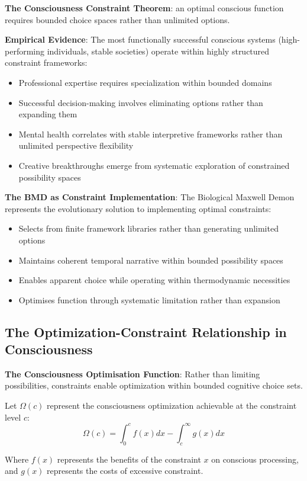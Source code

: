 \documentclass[12pt]{article}
\begin{document}
\textbf{The Consciousness Constraint Theorem}: an optimal conscious function requires bounded choice spaces rather than unlimited options.

\textbf{Empirical Evidence}: The most functionally successful conscious systems (high-performing individuals, stable societies) operate within highly structured constraint frameworks:
\begin{itemize}
\item Professional expertise requires specialization within bounded domains
\item Successful decision-making involves eliminating options rather than expanding them
\item Mental health correlates with stable interpretive frameworks rather than unlimited perspective flexibility
\item Creative breakthroughs emerge from systematic exploration of constrained possibility spaces
\end{itemize}

\textbf{The BMD as Constraint Implementation}: The Biological Maxwell Demon represents the evolutionary solution to implementing optimal constraints:
\begin{itemize}
\item Selects from finite framework libraries rather than generating unlimited options
\item Maintains coherent temporal narrative within bounded possibility spaces
\item Enables apparent choice while operating within thermodynamic necessities
\item Optimises function through systematic limitation rather than expansion
\end{itemize}

\subsection{The Optimization-Constraint Relationship in Consciousness}

\textbf{The Consciousness Optimisation Function}: Rather than limiting possibilities, constraints enable optimization within bounded cognitive choice sets.

Let $\Omega(c)$ represent the consciousness optimization achievable at the constraint level $c$:
$$\Omega(c) = \int_0^c f(x)dx - \int_c^{\infty} g(x)dx$$

Where $f(x)$ represents the benefits of the constraint $x$ on conscious processing, and $g(x)$ represents the costs of excessive constraint.
\end{document}
